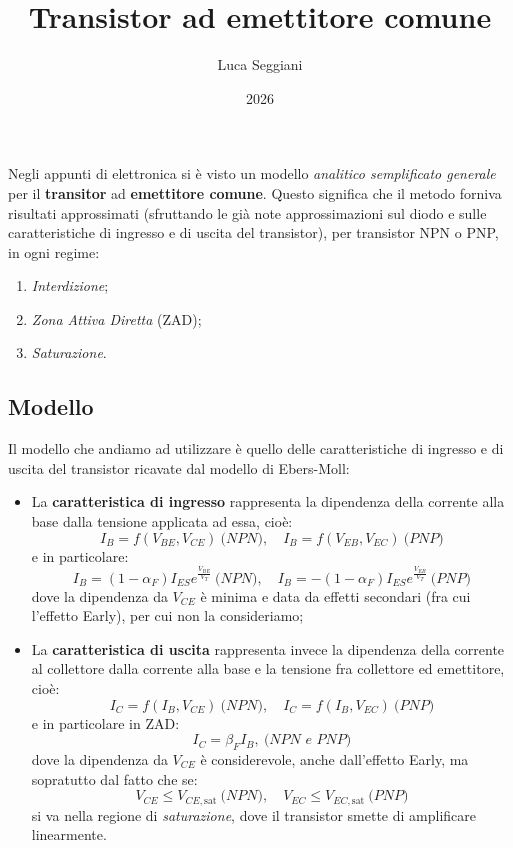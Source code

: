 \documentclass[a4paper,11pt]{article}
\title{Transistor ad emettitore comune}
\author{Luca Seggiani}
\date{2026}
\makeatletter
\renewcommand{\maketitle} {
	\begin{center} 
		\begin{minipage}[t]{.8\textwidth}
			\textsf{\LARGE\bfseries \@title} 
		\end{minipage}%
		\begin{minipage}[t]{.2\textwidth}
			\raggedleft \vspace{-1.65em}
			\textsf{\small \@author} \vfill
			\textsf{\small \@date}
		\end{minipage}
		\par
	\end{center}

	\thispagestyle{empty}
	\pagestyle{fancy}
}
\makeatother
\begin{document}
\pagestyle{fancy}
\thispagestyle{empty}
\renewcommand{\thispagestyle}[1]{}

\maketitle

Negli appunti di elettronica si è visto un modello \textit{analitico semplificato generale} per il \textbf{transitor} ad \textbf{emettitore comune}. Questo significa che il metodo forniva risultati approssimati (sfruttando le già note approssimazioni sul diodo e sulle caratteristiche di ingresso e di uscita del transistor), per transistor NPN o PNP, in ogni regime:
\begin{enumerate}
	\item \textit{Interdizione};
	\item \textit{Zona Attiva Diretta} (ZAD);
	\item \textit{Saturazione}.
\end{enumerate}

\subsection{Modello}
Il modello che andiamo ad utilizzare è quello delle caratteristiche di ingresso e di uscita del transistor ricavate dal modello di Ebers-Moll:
\begin{itemize}
\item La \textbf{caratteristica di ingresso} rappresenta la dipendenza della corrente alla base dalla tensione applicata ad essa, cioè:
$$
I_B = f(V_{BE}, V_{CE}) \ \textit{(NPN)}
, \quad
I_B = f(V_{EB}, V_{EC}) \ \textit{(PNP)}
$$
e in particolare:
$$
I_B = (1 - \alpha_F) I_{ES} e^{\frac{V_{BE}}{V_T}} \ \textit{(NPN)}
, \quad
I_B = -(1 - \alpha_F) I_{ES} e^{\frac{V_{EB}}{V_T}} \ \textit{(PNP)}
$$
dove la dipendenza da $V_{CE}$ è minima e data da effetti secondari (fra cui l'effetto Early), per cui non la consideriamo;
\item La \textbf{caratteristica di uscita} rappresenta invece la dipendenza della corrente al collettore dalla corrente alla base e la tensione fra collettore ed emettitore, cioè:
$$
I_C = f(I_B, V_{CE}) \ \textit{(NPN)}
, \quad
I_C = f(I_B, V_{EC}) \ \textit{(PNP)}
$$
e in particolare in ZAD:
$$
I_C = \beta_F I_B,  \ \textit{(NPN e PNP)}
$$
dove la dipendenza da $V_{CE}$ è considerevole, anche dall'effetto Early, ma sopratutto dal fatto che se:
$$
V_{CE} \leq V_{CE, \mathrm{sat}} \ \textit{(NPN)}
, \quad
V_{EC} \leq V_{EC, \mathrm{sat}} \ \textit{(PNP)}
$$
si va nella regione di \textit{saturazione}, dove il transistor smette di amplificare linearmente.
\end{itemize}
\end{document}
